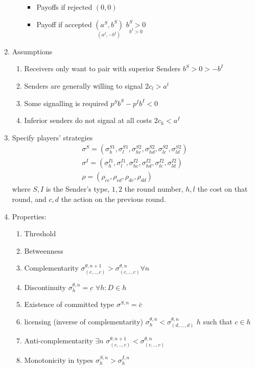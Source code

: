 \documentclass[11pt]{article}
\theoremstyle{plainCl1}
\begin{document}
\begin{enumerate}[label={(\alph*)}]
\begin{enumerate}[label={(\arabic*)}]
\begin{itemize}
			\item Payoffs if rejected \quad $(0,0)$
			\item Payoff if accepted \quad  $\underset{(a^I, -b^I) }{(a^S, b^S)}$ \quad $\underset{b^I > 0}{b^S > 0}$
			\end{itemize}
	\end{enumerate}
\item Assumptions
	\begin{enumerate}[label={(\arabic*)}]
	\item Receivers only want to pair with superior Senders \quad $b^S > 0 > -b^I$
	\item Senders are generally willing to signal \quad $2c_l > a^t$
	\item Some signalling is required \quad $p^S b^S - p^I b^I <0$
	\item Inferior senders do not signal at all costs \quad $2c_h < a^I$
	\end{enumerate}
	
\item Specify players' strategies
	\begin{equation}\label{strategies2}
	\begin{array}{l}	
	\sigma^S = (\sigma^{S1}_h, \sigma^{S1}_l, \sigma^{S2}_{hc}, \sigma^{S2}_{hd}, \sigma^{S2}_{lc}, \sigma^{S2}_{ld})\\
	\sigma^I = (\sigma^{I1}_h, \sigma^{I1}_l, \sigma^{I2}_{hc}, \sigma^{I2}_{hd}, \sigma^{I2}_{lc}, \sigma^{I2}_{ld})\\
	\rho = (\rho_{cc}, \rho_{cd}, \rho_{dc}, \rho_{dd})
	\end{array}
	\end{equation}
	where $S,I$ is the Sender's type, $1,2$ the round number, $h,l$ the cost on that round, and $c,d$ the action on the previous round.
\item Properties:
	\begin{enumerate}[label={(\arabic*)}]
	    \item Threshold \quad 
	    \item Betweenness \quad
	    \item Complementarity \quad $\sigma^{\theta,n+1}_{(c,..,c)} > \sigma^{\theta,n}_{(c,..,c)} \forall n$
	    \item Discontinuity \quad $\sigma^{\theta,n}_{h} = \underbar{c}$ \quad $\forall h: D \in h$
	    \item Existence of committed type \quad $\sigma^{S,n} = \bar{c}$
	    \item licensing (inverse of complementarity) \quad $\sigma^{\theta,n}_{h} < \sigma^{\theta,n}_{(d,...,d)}$ \quad $h$ such that $c \in h$
	    \item Anti-complementarity \quad $\exists n$ \quad $\sigma^{\theta,n+1}_{(c,..,c)} < \sigma^{\theta,n}_{(c,..,c)}$
	    \item Monotonicity in types \quad $\sigma^{S,n}_{h} > \sigma^{I,n}_{h}$
	\end{enumerate}
\end{enumerate}
\end{document}
